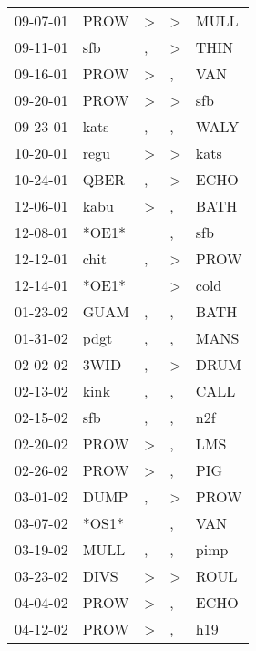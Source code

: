 \begin{supertabular}{lllll}
 09-07-01 &   PROW &     \textgreater &     \textgreater &   MULL \\
 09-11-01 &    sfb &                , &     \textgreater &   THIN \\
 09-16-01 &   PROW &     \textgreater &                , &    VAN \\
 09-20-01 &   PROW &     \textgreater &     \textgreater &    sfb \\
 09-23-01 &   kats &                , &                , &   WALY \\
 10-20-01 &   regu &     \textgreater &     \textgreater &   kats \\
 10-24-01 &   QBER &                , &     \textgreater &   ECHO \\
 12-06-01 &   kabu &     \textgreater &                , &   BATH \\
 12-08-01 &  *OE1* &                  &                , &    sfb \\
 12-12-01 &   chit &                , &     \textgreater &   PROW \\
 12-14-01 &  *OE1* &                  &     \textgreater &   cold \\
 01-23-02 &   GUAM &                , &                , &   BATH \\
 01-31-02 &   pdgt &                , &                , &   MANS \\
 02-02-02 &   3WID &                , &     \textgreater &   DRUM \\
 02-13-02 &   kink &                , &                , &   CALL \\
 02-15-02 &    sfb &                , &                , &    n2f \\
 02-20-02 &   PROW &     \textgreater &                , &    LMS \\
 02-26-02 &   PROW &     \textgreater &                , &    PIG \\
 03-01-02 &   DUMP &                , &     \textgreater &   PROW \\
 03-07-02 &  *OS1* &                  &                , &    VAN \\
 03-19-02 &   MULL &                , &                , &   pimp \\
 03-23-02 &   DIVS &     \textgreater &     \textgreater &   ROUL \\
 04-04-02 &   PROW &     \textgreater &                , &   ECHO \\
 04-12-02 &   PROW &     \textgreater &                , &    h19 \\

\end{supertabular}
